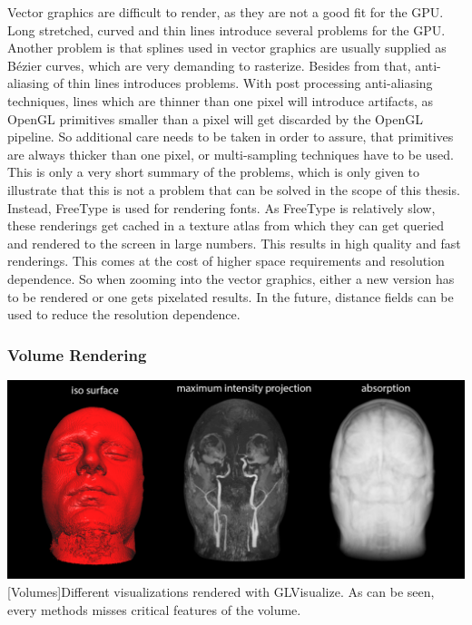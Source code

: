 Vector graphics are difficult to render, as they are not a good fit for the \ac{GPU}.
Long stretched, curved and thin lines introduce several problems for the GPU\cite{Liland565821}.
Another problem is that splines used in vector graphics are usually supplied as Bézier curves, which are very demanding to rasterize.
Besides from that, anti-aliasing of thin lines introduces problems. 
With post processing anti-aliasing techniques, lines which are thinner than one pixel will introduce artifacts, as OpenGL primitives smaller than a pixel will get discarded by the \ac{OpenGL} pipeline. So additional care needs to be taken in order to assure, that primitives are always thicker than one pixel, or multi-sampling techniques have to be used.
This is only a very short summary of the problems, which is only given to illustrate that this is not a problem that can be solved in the scope of this thesis. 
Instead, FreeType\cite{FreeType} is used for rendering fonts. As FreeType is relatively slow, these renderings get cached in a texture atlas from which they can get queried and rendered to the screen in large numbers.
This results in high quality and fast renderings. This comes at the cost of higher space requirements and resolution dependence.
So when zooming into the vector graphics, either a new version has to be rendered or one gets pixelated results.
In the future, distance fields can be used to reduce the resolution dependence\cite{Green:2007:IAM:1281500.1281665}.

\subsubsection{Volume Rendering}
\vspace{1em}
\begin{minipage}{\linewidth}
    \centering
    \includegraphics[width=0.9\linewidth]{graphics/volumes.png}
    [Volumes]{Different visualizations rendered with GLVisualize. As can be seen, every methods misses critical features of the volume.}
    \label{fig:volumes}
\end{minipage}

